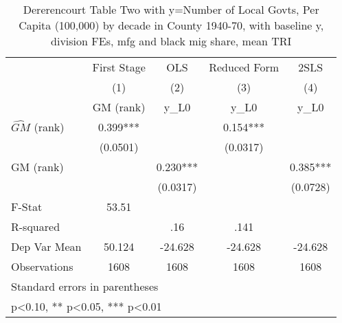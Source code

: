 \begin{table}[htbp]\centering
\def\sym#1{\ifmmode^{#1}\else\(^{#1}\)\fi}
\caption{Dererencourt Table Two with y=Number of Local Govts, Per Capita (100,000) by decade in County 1940-70, with baseline y, division FEs, mfg and black mig share, mean TRI}
\begin{tabular}{l*{4}{c}}
\toprule
                    & First Stage   &         OLS   &Reduced Form   &        2SLS   \\
                    &\multicolumn{1}{c}{(1)}&\multicolumn{1}{c}{(2)}&\multicolumn{1}{c}{(3)}&\multicolumn{1}{c}{(4)}\\
                    &\multicolumn{1}{c}{GM  (rank)}&\multicolumn{1}{c}{y\_L0}&\multicolumn{1}{c}{y\_L0}&\multicolumn{1}{c}{y\_L0}\\
\midrule
$\hat{GM}$ (rank)   &       0.399***&               &       0.154***&               \\
                    &    (0.0501)   &               &    (0.0317)   &               \\
\addlinespace
GM  (rank)          &               &       0.230***&               &       0.385***\\
                    &               &    (0.0317)   &               &    (0.0728)   \\
\midrule
F-Stat              &       53.51   &               &               &               \\
R-squared           &               &         .16   &        .141   &               \\
Dep Var Mean        &      50.124   &     -24.628   &     -24.628   &     -24.628   \\
Observations        &        1608   &        1608   &        1608   &        1608   \\
\bottomrule
\multicolumn{5}{l}{\footnotesize Standard errors in parentheses}\\
\multicolumn{5}{l}{\footnotesize * p<0.10, ** p<0.05, *** p<0.01}\\
\end{tabular}
\end{table}
